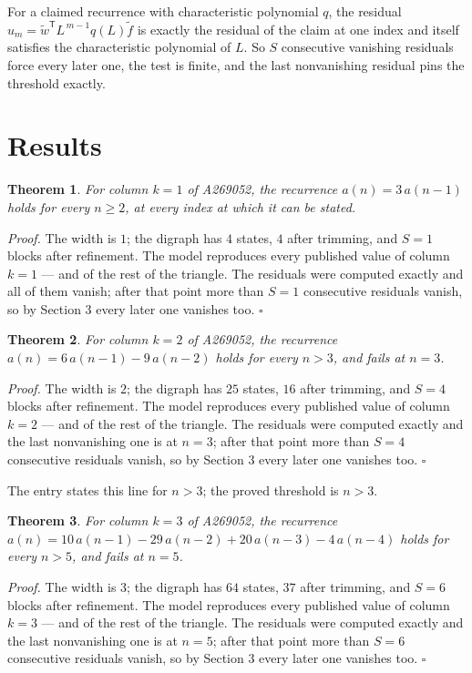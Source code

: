 \documentclass[11pt]{article}
\newtheorem{theorem}{Theorem}
\theoremstyle{definition}
\begin{document}
For a claimed recurrence with characteristic polynomial $q$, the residual $u_m = \tilde w^{\mathsf T}L^{\,m-1}q(L)\tilde f$ is exactly the residual of the claim at one index and itself satisfies the characteristic polynomial of $L$. So $S$ consecutive vanishing residuals force every later one, the test is finite, and the last nonvanishing residual pins the threshold exactly.

\section{Results}

\begin{theorem} For column $k = 1$ of A269052, the recurrence $a(n) = 3\,a(n-1)$ holds for every $n \ge 2$, at every index at which it can be stated.\end{theorem}

{\itshape Proof.} The width is $1$; the digraph has $4$ states, $4$ after trimming, and $S = 1$ blocks after refinement. The model reproduces every published value of column $k = 1$ --- and of the rest of the triangle. The residuals were computed exactly and all of them vanish; after that point more than $S = 1$ consecutive residuals vanish, so by Section 3 every later one vanishes too. $\square$

\begin{theorem} For column $k = 2$ of A269052, the recurrence $a(n) = 6\,a(n-1) - 9\,a(n-2)$ holds for every $n > 3$, and fails at $n = 3$.\end{theorem}

{\itshape Proof.} The width is $2$; the digraph has $25$ states, $16$ after trimming, and $S = 4$ blocks after refinement. The model reproduces every published value of column $k = 2$ --- and of the rest of the triangle. The residuals were computed exactly and the last nonvanishing one is at $n = 3$; after that point more than $S = 4$ consecutive residuals vanish, so by Section 3 every later one vanishes too. $\square$

The entry states this line for $n > 3$; the proved threshold is $n > 3$.

\begin{theorem} For column $k = 3$ of A269052, the recurrence $a(n) = 10\,a(n-1) - 29\,a(n-2) + 20\,a(n-3) - 4\,a(n-4)$ holds for every $n > 5$, and fails at $n = 5$.\end{theorem}

{\itshape Proof.} The width is $3$; the digraph has $64$ states, $37$ after trimming, and $S = 6$ blocks after refinement. The model reproduces every published value of column $k = 3$ --- and of the rest of the triangle. The residuals were computed exactly and the last nonvanishing one is at $n = 5$; after that point more than $S = 6$ consecutive residuals vanish, so by Section 3 every later one vanishes too. $\square$
\end{document}
